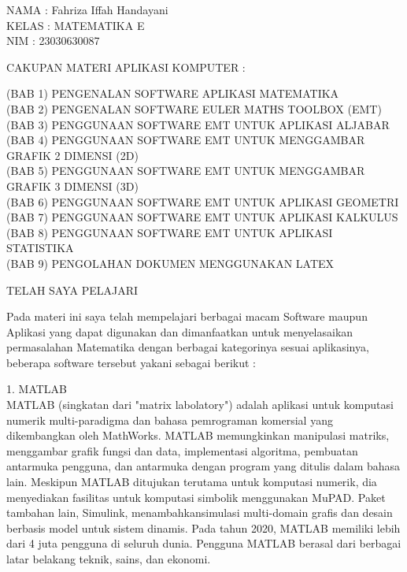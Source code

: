 \documentclass[a4paper,10pt]{article}
\begin{document}
\begin{eulernotebook}
\begin{eulercomment}
NAMA  : Fahriza Iffah Handayani\\
KELAS : MATEMATIKA E\\
NIM   : 23030630087

\end{eulercomment}
\eulersubheading{}
\begin{eulercomment}
CAKUPAN MATERI APLIKASI KOMPUTER :

(BAB 1) PENGENALAN SOFTWARE APLIKASI MATEMATIKA\\
(BAB 2) PENGENALAN SOFTWARE EULER MATHS TOOLBOX (EMT)\\
(BAB 3) PENGGUNAAN SOFTWARE EMT UNTUK APLIKASI ALJABAR\\
(BAB 4) PENGGUNAAN SOFTWARE EMT UNTUK MENGGAMBAR GRAFIK 2 DIMENSI (2D)\\
(BAB 5) PENGGUNAAN SOFTWARE EMT UNTUK MENGGAMBAR GRAFIK 3 DIMENSI (3D)\\
(BAB 6) PENGGUNAAN SOFTWARE EMT UNTUK APLIKASI GEOMETRI\\
(BAB 7) PENGGUNAAN SOFTWARE EMT UNTUK APLIKASI KALKULUS\\
(BAB 8) PENGGUNAAN SOFTWARE EMT UNTUK APLIKASI STATISTIKA\\
(BAB 9) PENGOLAHAN DOKUMEN MENGGUNAKAN LATEX

\end{eulercomment}
\eulersubheading{}
\begin{eulercomment}
TELAH SAYA PELAJARI

Pada materi ini saya telah mempelajari berbagai macam Software maupun
Aplikasi yang dapat digunakan dan dimanfaatkan untuk menyelasaikan
permasalahan Matematika dengan berbagai kategorinya sesuai
aplikasinya, beberapa software tersebut yakani sebagai berikut :

1. MATLAB\\
MATLAB (singkatan dari "matrix labolatory") adalah aplikasi untuk
komputasi numerik multi-paradigma dan bahasa pemrograman komersial
yang dikembangkan oleh MathWorks. MATLAB memungkinkan manipulasi
matriks, menggambar grafik fungsi dan data, implementasi algoritma,
pembuatan antarmuka pengguna, dan antarmuka dengan program yang
ditulis dalam bahasa lain. Meskipun MATLAB ditujukan terutama untuk
komputasi numerik, dia menyediakan fasilitas untuk komputasi simbolik
menggunakan MuPAD. Paket tambahan lain, Simulink, menambahkansimulasi
multi-domain grafis dan desain berbasis model untuk sistem dinamis.
Pada tahun 2020, MATLAB memiliki lebih dari 4 juta pengguna di seluruh
dunia. Pengguna MATLAB berasal dari berbagai latar belakang teknik,
sains, dan ekonomi.


\end{eulercomment}
\end{eulernotebook}
\end{document}
